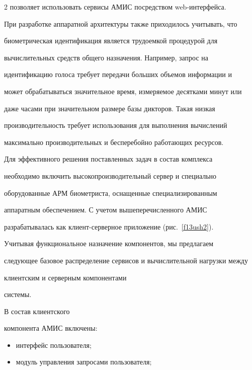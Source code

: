 \begin{multicols}{2}
позволяет использовать сервисы АМИС посредством web-ин\-тер\-фей\-са.

  

  При разработке аппаратной архитектуры также приходилось учитывать, что 

биометрическая идентификация является трудоемкой процедурой для 

вычислительных средств общего назначения. Например, запрос на 

идентификацию голоса требует передачи больших объемов информации и 

может обрабатываться значительное время, измеряемое десятками минут или 

даже часами при значительном размере базы дикторов. Такая низкая 

производительность требует использования для выполнения вычислений 

максимально производительных и бесперебойно работающих ресурсов. 

  

  Для эффективного решения поставленных задач в состав комплекса 

необходимо включить высокопроизводительный сервер и специально 

оборудованные АРМ биометриста, оснащенные специализированным 

аппаратным обеспечением. С учетом вышеперечисленного АМИС 

разрабатывалась как клиент-серверное приложение (рис.~\ref{f13ush2}). 

  

  Учитывая функциональное назначение компонентов, мы предлагаем 

следующее базовое распределение сервисов и вычислительной нагрузки \mbox{между} 

клиентским и серверным компонентами %

сис\-темы. 



В состав клиентского 

компонента АМИС включены:

  \begin{itemize}

\item интерфейс пользователя;\\[-13pt]

\item модуль управления запросами пользователя;\\[-13pt]


\end{itemize}
\end{multicols}
